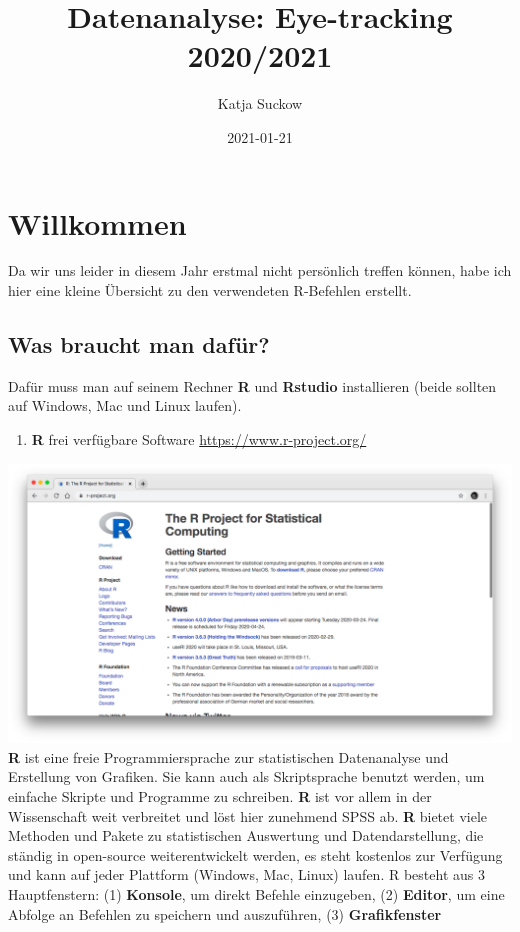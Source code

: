 \documentclass[]{book}
\title{Datenanalyse: Eye-tracking 2020/2021}
\author{Katja Suckow}
\date{2021-01-21}
\providecommand{\tightlist}{%
  \setlength{\itemsep}{0pt}\setlength{\parskip}{0pt}}
\begin{document}
\maketitle

{
\setcounter{tocdepth}{1}
\tableofcontents
}
\chapter{Willkommen}\label{willkommen}

Da wir uns leider in diesem Jahr erstmal nicht persönlich treffen
können, habe ich hier eine kleine Übersicht zu den verwendeten
R-Befehlen erstellt.

\section{Was braucht man dafür?}\label{was-braucht-man-dafuxfcr}

Dafür muss man auf seinem Rechner \textbf{R} und \textbf{Rstudio}
installieren (beide sollten auf Windows, Mac und Linux laufen).

\begin{enumerate}
\def\labelenumi{\arabic{enumi}.}
\tightlist
\item
  \textbf{R} frei verfügbare Software \url{https://www.r-project.org/}
\end{enumerate}

\includegraphics{./img/Rdownload.png} \textbf{R} ist eine freie
Programmiersprache zur statistischen Datenanalyse und Erstellung von
Grafiken. Sie kann auch als Skriptsprache benutzt werden, um einfache
Skripte und Programme zu schreiben. \textbf{R} ist vor allem in der
Wissenschaft weit verbreitet und löst hier zunehmend SPSS ab. \textbf{R}
bietet viele Methoden und Pakete zu statistischen Auswertung und
Datendarstellung, die ständig in open-source weiterentwickelt werden, es
steht kostenlos zur Verfügung und kann auf jeder Plattform (Windows,
Mac, Linux) laufen. R besteht aus 3 Hauptfenstern: (1) \textbf{Konsole},
um direkt Befehle einzugeben, (2) \textbf{Editor}, um eine Abfolge an
Befehlen zu speichern und auszuführen, (3) \textbf{Grafikfenster}
\end{document}

